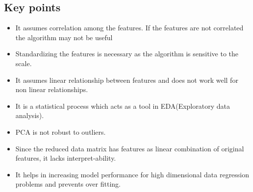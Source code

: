 \documentclass[12pt,letterpaper, onecolumn]{exam}
\begin{document}
\subsection*{Key points}
\begin{itemize}
\item It assumes correlation among the features. If the features are not correlated the algorithm may not be useful
\item Standardizing the features is necessary as the algorithm is sensitive to the scale.
\item It assumes linear relationship between features and does not work well for non linear relationships.
\item It is a statistical process which acts as a tool in EDA(Exploratory data analysis).
\item PCA is not robust to outliers.
\item Since the reduced data matrix has features as linear combination of original features, it lacks interpret-ability.
\item It helps in increasing model performance for high dimensional data regression problems and prevents over fitting.
\end{itemize}
\end{document}
